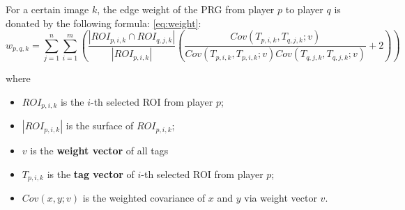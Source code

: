 \begin{definition}
For a certain image $k$, the edge weight of the PRG from player $p$ to player $q$ is donated 
by the following formula: \ref{eq:weight}:
\begin{equation}
\label{eq:weight}
w_{p,q,k} = 
\sum_{j=1}^{n}{
\sum_{i=1}^{m}{ \left(
  \frac{ | ROI_{p,i,k} \cap ROI_{q,j,k} | }
       {|ROI_{p,i,k}|}
  \left(
    \frac{Cov(T_{p,i,k}, T_{q,j,k}; v)}{Cov(T_{p,i,k}, T_{p,i,k}; v)Cov(T_{q,j,k}, T_{q,j,k}; v)} + 2
  \right)
\right)}}
\end{equation}

where 

\begin{itemize}
\item $ROI_{p, i, k}$ is the $i$-th selected ROI from player $p$;
\item $|ROI_{p, i, k}|$ is the surface of $ROI_{p, i, k}$;
\item $v$ is the \textbf{weight vector} of all tags
\item $T_{p, i, k}$ is the \textbf{tag vector} of $i$-th selected ROI from player $p$;
\item $Cov(x, y; v)$ is the weighted covariance of $x$ and $y$ via weight vector $v$.
\end{itemize}
\end{definition}



